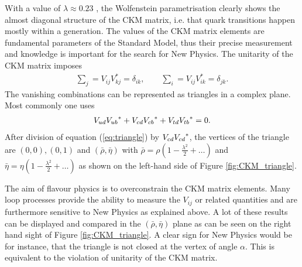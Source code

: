 With a value of $\lambda \approx 0.23$ \cite{PDG}, the Wolfenstein parametrisation clearly shows the almost diagonal structure of the CKM matrix, i.e. that quark transitions happen mostly within a generation.
The values of the CKM matrix elements are fundamental parameters of the Standard Model, thus their precise measurement and knowledge is important for the search for New Physics.
The unitarity of the CKM matrix imposes
\begin{align}
    \sum_j = V_{ij}V_{kj}^{\ast} = \delta_{ik}, \qquad \sum_i = V_{ij}V_{ik}^{\ast} = \delta_{jk}.
\end{align}
The vanishing combinations can be represented as triangles in a complex plane.
Most commonly one uses
\begin{align}
    {\ensuremath{V_{{u}{d}}}}{\ensuremath{V_{{u}{b}}}}^{\ast} + {V_{{c}{d}}}{V_{{c}{b}}}^{*} + {V_{{t}{d}}}{V_{{t}{b}}}^{\ast} = 0. \label{eq:triangle}
\end{align}
After division of equation (\ref{eq:triangle}) by ${V_{{c}{d}}}{V_{{c}{d}}}^{\ast}$, the vertices of the triangle are $(0,0), (0,1)$ and $(\bar{\rho}, \bar{\eta})$ with $\bar{\rho} = \rho (1 - \frac{\lambda^2}{2} + \ldots)$ and $\bar{\eta} = \eta (1 - \frac{\lambda^2}{2} + \ldots)$ as shown on the left-hand side of
Figure \ref{fig:CKM_triangle}.

The aim of flavour physics is to overconstrain the CKM matrix elements.
Many loop processes provide the ability to measure the $V_{ij}$ or related quantities and are furthermore sensitive to New Physics as explained above.
A lot of these results can be displayed and compared in the $(\bar{\rho}, \bar{\eta})$ plane as can be seen on the right hand sight of Figure \ref{fig:CKM_triangle}.
A clear sign for New Physics would be for instance, that the triangle is not closed at the vertex of angle $\alpha$.
This is equivalent to the violation of unitarity of the CKM matrix.

